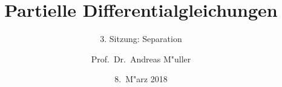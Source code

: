 \documentclass{beamer}
\title[]{Partielle Differentialgleichungen}
\subtitle{3. Sitzung: Separation}
\date[8.~M"arz 2018]{8.~M"arz 2018}
\author{Prof.~Dr.~Andreas M"uller}
\begin{document}
\begin{frame}
\titlepage
\end{frame}


\end{document}
